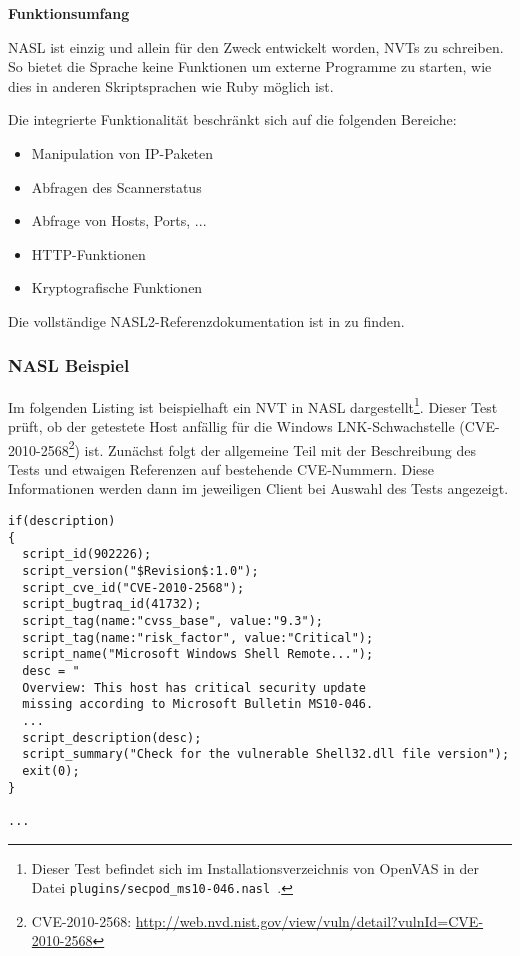 \textbf{Funktionsumfang}

NASL ist einzig und allein für den Zweck entwickelt worden, NVTs zu schreiben. 
So bietet die Sprache keine Funktionen um externe Programme zu starten, wie 
dies in anderen Skriptsprachen wie \zB Ruby möglich ist.

Die integrierte Funktionalität beschränkt sich \uA auf die folgenden Bereiche:

\begin{itemize}
  \item Manipulation von IP-Paketen
  \item Abfragen des Scannerstatus
  \item Abfrage von Hosts, Ports, ...
  \item HTTP-Funktionen
  \item Kryptografische Funktionen
\end{itemize}  

Die vollständige NASL2-Referenzdokumentation ist in \cite{openvas-nasl-reference} zu finden.

\subsubsection{NASL Beispiel} 

Im folgenden Listing ist beispielhaft ein NVT in NASL
dargestellt\footnote{Dieser Test befindet sich im
  Installationsverzeichnis von OpenVAS in der Datei
  \texttt{plugins/secpod\_ms10-046.nasl }.}. Dieser Test prüft, ob der
getestete Host anfällig für die Windows LNK-Schwachstelle
(CVE-2010-2568\footnote{CVE-2010-2568:
  \url{http://web.nvd.nist.gov/view/vuln/detail?vulnId=CVE-2010-2568}})
ist. Zunächst folgt der allgemeine Teil mit der Beschreibung des Tests
und etwaigen Referenzen auf bestehende CVE-Nummern. Diese
Informationen werden dann im jeweiligen Client bei Auswahl des Tests
angezeigt.

\begin{verbatim}
if(description)
{
  script_id(902226);
  script_version("$Revision$:1.0");
  script_cve_id("CVE-2010-2568");
  script_bugtraq_id(41732);
  script_tag(name:"cvss_base", value:"9.3");
  script_tag(name:"risk_factor", value:"Critical");
  script_name("Microsoft Windows Shell Remote...");
  desc = "
  Overview: This host has critical security update
  missing according to Microsoft Bulletin MS10-046.
  ...
  script_description(desc);
  script_summary("Check for the vulnerable Shell32.dll file version");
  exit(0);
}

...
\end{verbatim}

